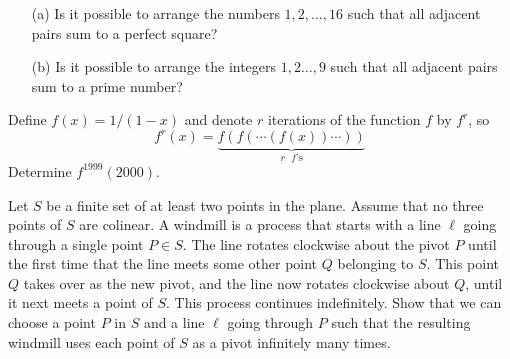 \documentclass{article}
\begin{document}
\begin{exercise}
    \begin{enumerate}
        \item[(a)] Is it possible to arrange the numbers \(1,2,\ldots,16\) such that all adjacent pairs sum to a perfect square?
        \item[(b)] Is it possible to arrange the integers \(1,2\ldots,9\) such that all adjacent pairs sum to a prime number?
    \end{enumerate}
\end{exercise}

\begin{exercise}
    Define $f(x)=1/(1-x)$ and denote $r$ iterations of the function $f$ by $f^r$, so 
    \[f^r(x)=\underbrace{f(f(\cdots(f(x))\cdots))}_{r\text{ $f$'s}}\] 
    Determine $f^{1999}(2000)$.
\end{exercise}

\begin{exercise}
    Let $S$ be a finite set of at least two points in the plane. Assume that no three points of $S$ are colinear. 
    A windmill is a process that starts with a line $\ell$ going through a single point $P \in S$. 
    The line rotates clockwise about the pivot $P$ until the first time that the line meets some other point $Q$ belonging to $S$. 
    This point $Q$ takes over as the new pivot, and the line now rotates clockwise about $Q$, until it next meets a point of $S$.
    This process continues indefinitely. 
    Show that we can choose a point $P$ in $S$ and a line $\ell$ going through $P$ such that the resulting windmill uses each point of $S$ as a pivot infinitely many times.
\end{exercise}
\end{document}
